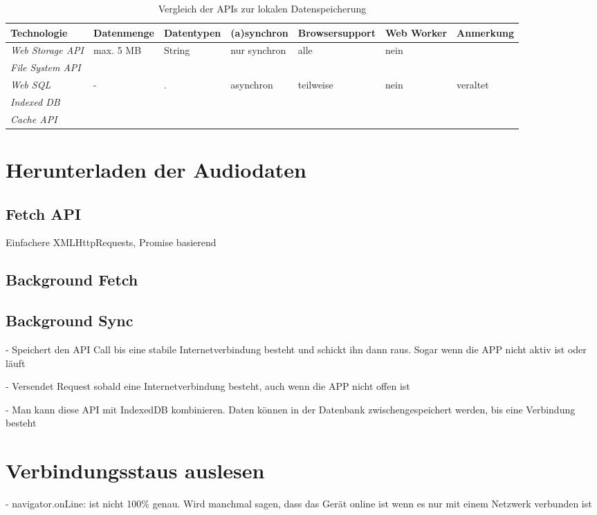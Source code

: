 \begin{table}[h]
  \caption{Vergleich der APIs zur lokalen Datenspeicherung}
  \label{Kap4:Datenspeicherung}
  \renewcommand{\arraystretch}{1.2}
  \centering
  \sffamily
  \begin{footnotesize}
    \begin{tabularx}{1.0\textwidth}{l l l l l l l}
      \toprule
      \textbf{Technologie} & \textbf{Datenmenge} & \textbf{Datentypen} & \textbf{(a)synchron} & \textbf{Browsersupport} & \textbf{Web Worker} & \textbf{Anmerkung} \\
      \midrule
      \emph{Web Storage \ac{API}} & max. 5 \ac{MB} & String & nur synchron & alle & nein & \\
      \emph{File System \ac{API}} &  &  &  &  &  & \\
      \emph{Web SQL} & - & . & asynchron & teilweise & nein & veraltet \\
      \emph{Indexed DB} &  &  &  &  &  & \\
      \emph{Cache \ac{API}} &  &  &  &  &  & \\
      \bottomrule
    \end{tabularx}
  \end{footnotesize}
  \rmfamily
\end{table}

\section{Herunterladen der Audiodaten}

\subsection{Fetch API}

Einfachere XMLHttpRequests, Promise basierend
\autocite{Rojas2020}

\subsection{Background Fetch}

\subsection{Background Sync}

- Speichert den API Call bis eine stabile Internetverbindung besteht und schickt ihn dann raus. Sogar wenn die APP nicht aktiv ist oder läuft \autocite{Sheppard2017}

- Versendet Request sobald eine Internetverbindung besteht, auch wenn die APP nicht offen ist \autocite{Rojas2020}

- Man kann diese API mit IndexedDB kombinieren. Daten können in der Datenbank zwischengespeichert werden, bis eine Verbindung besteht \autocite{Rojas2020}

\section{Verbindungsstaus auslesen}

- navigator.onLine: ist nicht 100\% genau. Wird manchmal sagen, dass das Gerät online ist wenn es nur mit einem Netzwerk verbunden ist \autocite{Sheppard2017}


